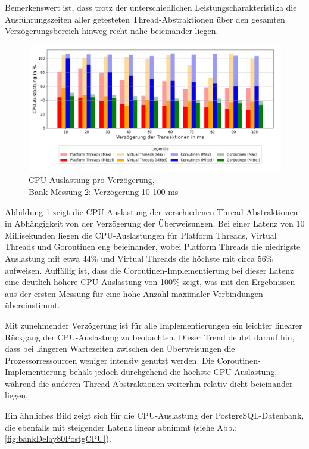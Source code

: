 \documentclass[fontsize=12pt,paper=a4,twoside=semi,parskip=half-,headsepline,headinclude]{scrreprt}
\begin{document}
Bemerkenswert ist, dass trotz der unterschiedlichen Leistungscharakteristika die Aus\-füh\-rungs\-zei\-ten aller getesteten Thread-Abstraktionen über den gesamten Ver\-zö\-ge\-rungs\-be\-reich hinweg recht nahe beieinander liegen.

\begin{figure}[H]
	\centering
	\includegraphics[scale=0.5]{figures/bank/delay80/cpu_usage_bar_plot.png}
	\caption{CPU-Auslastung pro Verzögerung,\\ Bank Messung 2: Verzögerung 10-100 ms}
	\label{fig:bankDelay80CPU}
\end{figure}

Abbildung \ref{fig:bankDelay80CPU} zeigt die CPU-Auslastung der verschiedenen Thread-Abstraktionen in Abhängigkeit von der Verzögerung der Überweisungen. Bei einer Latenz von 10 Millisekunden liegen die CPU-Auslastungen für Platform Threads, Virtual Threads und Goroutinen eng beieinander, wobei Platform Threads die niedrigste Auslastung mit etwa 44\% und Virtual Threads die höchste mit circa 56\% aufweisen. Auffällig ist, dass die Coroutinen-Implementierung bei dieser Latenz eine deutlich höhere CPU-Auslastung von 100\% zeigt, was mit den Ergebnissen aus der ersten Messung für eine hohe Anzahl maximaler Verbindungen übereinstimmt.

Mit zunehmender Verzögerung ist für alle Implementierungen ein leichter linearer Rück\-gang der CPU-Auslastung zu beobachten. Dieser Trend deutet darauf hin, dass bei längeren Wartezeiten zwischen den Überweisungen die Prozessorressourcen weniger intensiv genutzt werden. Die Coroutinen-Implementierung behält jedoch durchgehend die höchste CPU-Auslastung, während die anderen Thread-Abstraktionen weiterhin relativ dicht beieinander liegen.

Ein ähnliches Bild zeigt sich für die CPU-Auslastung der PostgreSQL-Datenbank, die ebenfalls mit steigender Latenz linear abnimmt (siehe Abb.: \ref{fig:bankDelay80PostgCPU}). 
\end{document}
